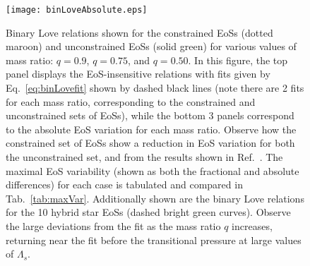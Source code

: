\documentclass[prd,twocolumn,nofootinbib,superscriptaddress,amsmath,amssymb]{revtex4-1}
\begin{document}
\begin{figure}
\begin{center} 
\texttt{[image: binLoveAbsolute.eps]}
\end{center}
\caption{
Binary Love relations shown for the constrained EoSs (dotted maroon) and unconstrained EoSs (solid green) for various values of mass ratio: $q=0.9$, $q=0.75$, and $q=0.50$.
In this figure, the top panel displays the EoS-insensitive relations with fits given by Eq.~\ref{eq:binLovefit} shown by dashed black lines (note there are 2 fits for each mass ratio, corresponding to the constrained and unconstrained sets of EoSs), while the bottom 3 panels correspond to the absolute EoS variation for each mass ratio.
Observe how the constrained set of EoSs show a reduction in EoS variation for both the unconstrained set, and from the results shown in Ref.~\cite{Yagi:binLove}.
The maximal EoS variability (shown as both the fractional and absolute differences) for each case is tabulated and compared in Tab.~\ref{tab:maxVar}.
Additionally shown are the binary Love relations for the 10 hybrid star EoSs (dashed bright green curves).
Observe the large deviations from the fit as the mass ratio $q$ increases, returning near the fit before the transitional pressure at large values of $\Lambda_s$.
}
\label{fig:binLove}
\end{figure} 
\end{document}
